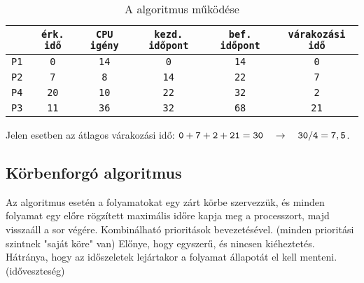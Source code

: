 \documentclass[../main.tex]{subfiles}
\begin{document}
\begin{table}[H]
	\centering
	\begin{tabular}{|c|c|c|c|c|c|}
		\hline
		            & \texttt{érk. idő} & \texttt{CPU igény} & \texttt{kezd. időpont} & \texttt{bef. időpont} & \texttt{várakozási idő}
		\\ \hline
		\texttt{P1} & \texttt{0}        & \texttt{14}        & \texttt{0}             & \texttt{14}           & \texttt{0}              \\
		\texttt{P2} & \texttt{7}        & \texttt{8}         & \texttt{14}            & \texttt{22}           & \texttt{7}              \\
		\texttt{P4} & \texttt{20}       & \texttt{10}        & \texttt{22}            & \texttt{32}           & \texttt{2}              \\
		\texttt{P3} & \texttt{11}       & \texttt{36}        & \texttt{32}            & \texttt{68}           & \texttt{21}             \\
		\hline
	\end{tabular}
	\caption{A  algoritmus működése}
	\label{table:sjf}
\end{table}

Jelen esetben az átlagos várakozási idő:
$\mathtt{0 + 7 + 2 + 21 = 30}
	\hspace*{1em}\rightarrow\hspace*{1em}
	\mathtt{30/4 = 7,5}$.

\subsection{Körbenforgó algoritmus}

Az  algoritmus esetén a folyamatokat egy zárt körbe szervezzük, és
minden folyamat egy előre rögzített maximális időre kapja meg a processzort,
majd visszaáll a sor végére. Kombinálható prioritások bevezetésével.
(minden prioritási szintnek "saját köre" van) Előnye, hogy egyszerű, és
nincsen kiéheztetés. Hátránya, hogy az időszeletek lejártakor a folyamat
állapotát el kell menteni. (időveszteség)
\end{document}
